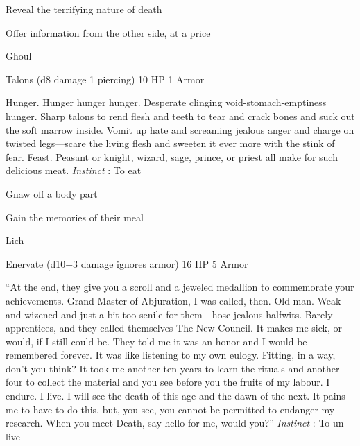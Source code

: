 \startitemize[1,packed]
         
\item Reveal the terrifying nature of death

         
\item Offer information from the other side, at a price

       
\stopitemize
       
\startMonsterName
Ghoul	 
\stopMonsterName
       

Talons (d8 damage 1 piercing)	10 HP	1 Armor

       


       
\startMonsterDescription
Hunger.  Hunger hunger hunger.  Desperate clinging void-stomach-emptiness hunger.  Sharp talons to rend flesh and teeth to tear and crack bones and suck out the soft marrow inside.  Vomit up hate and screaming jealous anger and charge on twisted legs—scare the living flesh and sweeten it ever more with the stink of fear.  Feast.  Peasant or knight, wizard, sage, prince, or priest all make for such delicious meat. {\em Instinct} : To eat
\stopMonsterDescription
       
\startitemize[1,packed]
         
\item Gnaw off a body part

         
\item Gain the memories of their meal

       
\stopitemize
       
\startMonsterName
Lich	 
\stopMonsterName
       

Enervate (d10+3 damage ignores armor)	16 HP	5 Armor

       


       
\startMonsterDescription
“At the end, they give you a scroll and a jeweled medallion to commemorate your achievements.  Grand Master of Abjuration, I was called, then.  Old man.  Weak and wizened and just a bit too senile for them—hose jealous halfwits.  Barely apprentices, and they called themselves The New Council.  It makes me sick, or would, if I still could be.  They told me it was an honor and I would be remembered forever.  It was like listening to my own eulogy.  Fitting, in a way, don’t you think?  It took me another ten years to learn the rituals and another four to collect the material and you see before you the fruits of my labour.  I endure.  I live.  I will see the death of this age and the dawn of the next.  It pains me to have to do this, but, you see, you cannot be permitted to endanger my research.  When you meet Death, say hello for me, would you?” {\em Instinct} : To un-live
\stopMonsterDescription
       
